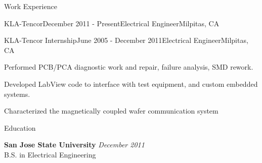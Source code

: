 \documentclass{resume} %
\begin{document}
\begin{rSection}{Work Experience}
\begin{rSubsection}{KLA-Tencor}{December 2011 - Present}{Electrical Engineer}{Milpitas, CA}
\end{rSubsection}


\begin{rSubsection}{KLA-Tencor Internship}{June 2005 - December 2011}{Electrical Engineer}{Milpitas, CA}
\item Performed PCB/PCA diagnostic work and repair, failure analysis, SMD rework.
\item Developed LabView code to interface with test equipment, and custom embedded systems.
\item Characterized the magnetically coupled wafer communication system
\end{rSubsection}

\end{rSection}


\begin{rSection}{Education}

{\bf San Jose State University} \hfill {\em December 2011} \\ 
B.S. in Electrical Engineering \\

\end{rSection}





\end{document}
